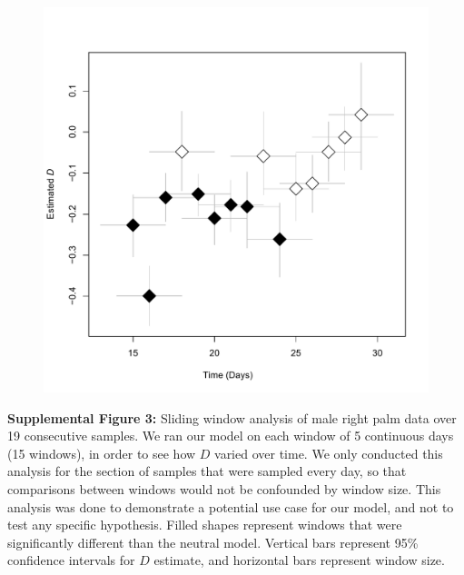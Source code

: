 \documentclass{article}
\begin{document}
{\begin{figure}[t]
	\centering
	\includegraphics[scale=0.80]{figs/Fig_S3.pdf}
\end{figure}
\textbf{Supplemental Figure 3:}\label{sec:figureS3} Sliding window analysis of male right palm data over 19 consecutive samples. We ran our model on each window of 5 continuous days (15 windows), in order to see how \(D\) varied over time. We only conducted this analysis for the section of samples that were sampled every day, so that comparisons between windows would not be confounded by window size. This analysis was done to demonstrate a potential use case for our model, and not to test any specific hypothesis. Filled shapes represent windows that were significantly different than the neutral model. Vertical bars represent 95\% confidence intervals for \(D\) estimate, and horizontal bars represent window size.
\newpage

}
\end{document}

